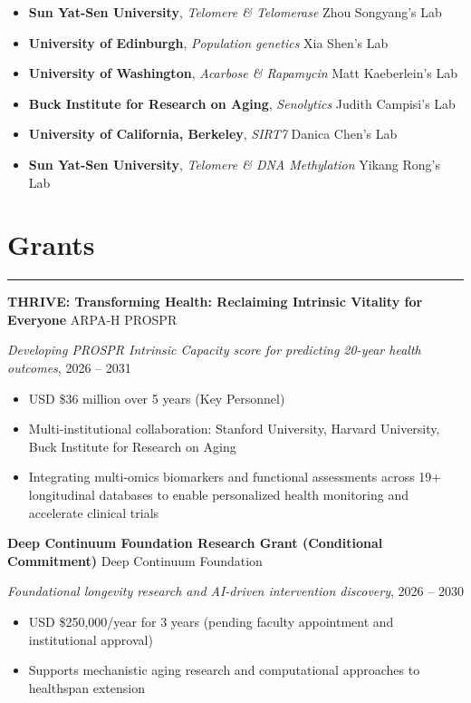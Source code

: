 \documentclass[
  11pt,
]
{article}
\providecommand{\tightlist}{%
  \setlength{\itemsep}{0pt}\setlength{\parskip}{0pt}}
\begin{document}
\begin{itemize}
\tightlist
\item
  \textbf{Sun Yat-Sen University}, \emph{Telomere \& Telomerase}
  \hfill Zhou Songyang's Lab
\item
  \textbf{University of Edinburgh}, \emph{Population genetics}
  \hfill Xia Shen's Lab
\item
  \textbf{University of Washington}, \emph{Acarbose \& Rapamycin}
  \hfill Matt Kaeberlein's Lab
\item
  \textbf{Buck Institute for Research on Aging}, \emph{Senolytics}
  \hfill Judith Campisi's Lab
\item
  \textbf{University of California, Berkeley}, \emph{SIRT7}
  \hfill Danica Chen's Lab
\item
  \textbf{Sun Yat-Sen University}, \emph{Telomere \& DNA Methylation}
  \hfill Yikang Rong's Lab
\end{itemize}

\section{Grants}\label{grants}

\hrule

\textbf{THRIVE: Transforming Health: Reclaiming Intrinsic Vitality for
Everyone} \hfill ARPA-H PROSPR

\emph{Developing PROSPR Intrinsic Capacity score for predicting 20-year
health outcomes}, \hfill 2026 -- 2031

\begin{itemize}
\tightlist
\item
  USD \$36 million over 5 years (Key Personnel)
\item
  Multi-institutional collaboration: Stanford University, Harvard
  University, Buck Institute for Research on Aging
\item
  Integrating multi-omics biomarkers and functional assessments across
  19+ longitudinal databases to enable personalized health monitoring
  and accelerate clinical trials
\end{itemize}

\textbf{Deep Continuum Foundation Research Grant (Conditional
Commitment)} \hfill Deep Continuum Foundation

\emph{Foundational longevity research and AI-driven intervention
discovery}, \hfill 2026 -- 2030

\begin{itemize}
\tightlist
\item
  USD \$250,000/year for 3 years (pending faculty appointment and
  institutional approval)
\item
  Supports mechanistic aging research and computational approaches to
  healthspan extension
\end{itemize}
\end{document}
